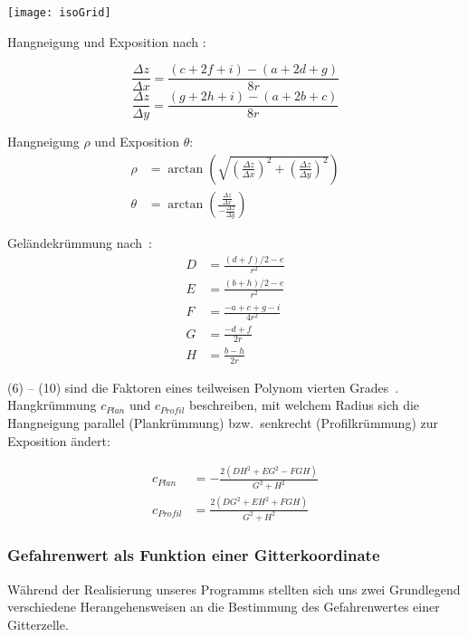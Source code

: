 \begin{Figure}
  \centering
  \texttt{[image: isoGrid]}
\end{Figure}

Hangneigung und Exposition nach \cite{gisslopeaspect}:

\begin{equation} \label{eq1}
  \frac{\Delta z}{\Delta x} = \frac{(c + 2f + i) - (a + 2d + g)}{8r}
\end{equation}
\begin{equation} \label{eq2}
  \frac{\Delta z}{\Delta y} = \frac{(g + 2h + i) - (a + 2b + c)}{8r}
\end{equation}

Hangneigung $\rho$ und Exposition $\theta$:
\begin{align}
  \rho &= \arctan \left( \sqrt{
    {\left( \frac{\Delta z}{\Delta x}\right)}^2 + 
    {\left(\frac{\Delta z}{\Delta y}\right)}^2}
  \right)\\
  \theta &= \arctan\left(\frac{\frac{\Delta z}{\Delta x}}{-\frac{\Delta z}{\Delta y}}\right)
\end{align}

Geländekrümmung nach~\cite{gismath}:
\begin{align}
  D &= \frac{{(d + f) / 2 - e}}{{r^2}} \\
  E &= \frac{{(b + h) / 2 - e}}{{r^2}} \\
  F &= \frac{{-a + c + g - i}}{{4r^2}} \\
  G &= \frac{{-d + f}}{{2r}} \\
  H &= \frac{{b - h}}{{2r}}
\end{align}

(6) -- (10) sind die Faktoren eines teilweisen Polynom vierten Grades~\cite{gismath}.
Hangkrümmung $c_{Plan}$ und $c_{Profil}$ beschreiben, mit welchem Radius sich die Hangneigung parallel (Plankrümmung) bzw.\ senkrecht (Profilkrümmung) zur Exposition ändert:

\begin{align}
    c_{Plan} &= -\frac{{2(DH^2 + EG^2 - FGH)}}{{G^2 + H^2}}
    \\
    c_{Profil} &= \frac{{2(DG^2 + EH^2 + FGH)}}{{G^2 + H^2}}
\end{align}

\subsubsection{Gefahrenwert als Funktion einer Gitterkoordinate}
Während der Realisierung unseres Programms stellten sich uns zwei Grundlegend verschiedene Herangehensweisen an die Bestimmung des Gefahrenwertes einer Gitterzelle. 

